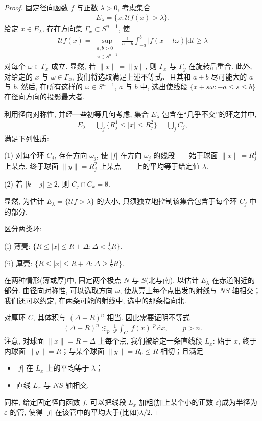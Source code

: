 \begin{proof}
固定径向函数 $f$ 与正数 $\lambda > 0$, 考虑集合
\begin{align*}
  E_{\lambda}=\{x:\mathcal{U}f(x)>\lambda\}.
\end{align*}
给定 $x \in E_\lambda$, 存在方向集 $\Gamma_x \subset S^{n-1}$, 使
\begin{align*}
  \mathcal{U}f(x)=\sup_{\substack{a,b>0\\ \omega\in S^{n-1}}}\frac{1}{a+b}\int_{-a}^{b}\left|f(x+t\omega)\right|\mathrm{d}t\geq\lambda
\end{align*}
对每个 $\omega \in \Gamma_x$ 成立. 显然, 若 $\|x\| = \|y\|$, 则 $\Gamma_x$ 与 $\Gamma_y$ 在旋转后重合. 此外, 对给定的 $x$ 与 $\omega \in \Gamma_x$, 我们将选取满足上述不等式、且其和 $a + b$ 尽可能大的 $a$ 与 $b$. 然后, 在所有这样的 $\omega \in S^{n-1}$, $a$ 与 $b$ 中, 选出使线段 $\{x + s\omega : -a \leq s \leq b\}$ 在径向方向的投影最大者.

利用径向对称性, 并经一些初等几何考虑, 集合 $E_{\lambda}$ 包含在``几乎不交''的环之并中,
\begin{align*}
  E_{\lambda}=\bigcup_{j}\{R_{j}^{1}\leq|x|\leq R_{j}^{2}\}=\bigcup_{j}C_{j},
\end{align*}
满足下列性质:

(1) 对每个环 $C_j$, 存在方向 $\omega_j$, 使 $|f|$ 在方向 $\omega_j$ 的线段——始于球面 $\|x\| = R_j^1$ 上某点, 终于球面 $\|y\| = R_j^2$ 上某点——上的平均等于给定值 $\lambda$.

(2) 若 $|k - j| \geq 2$, 则 $C_j \cap C_k = \emptyset$.

显然, 为估计 $E_\lambda = \{\mathcal{U}f > \lambda\}$ 的大小, 只须独立地控制该集合包含于每个环 $C_j$ 中的部分.

区分两类环:

(i) 薄壳: $\{R \leq |x| \leq R + \Delta : \Delta < \tfrac{1}{2}R\}$.

(ii) 厚壳: $\{R \leq |x| \leq R + \Delta : \Delta \geq \frac{1}{2}R\}$.

在两种情形(薄或厚)中, 固定两个极点 $N$ 与 $S$(北与南), 以估计 $E_{\lambda}$ 在赤道附近的部分. 由径向对称性, 可以选取方向 $\omega$, 使从壳上每个点出发的射线与 $NS$ 轴相交；我们还可以约定, 在两条可能的射线中, 选中的那条指向北.

对厚环 $C$, 其体积与 $(\Delta + R)^n$ 相当. 因此需要证明不等式
\begin{align*}
  \left(\Delta+R\right)^{n}\lesssim_{p}\frac{1}{\lambda^{p}}\int_{C}\left|f(x)\right|^{p}\,\mathrm{d}x,\qquad p>n.
\end{align*}
注意, 对球面 $\|x\| = R + \Delta$ 上每个点, 我们被给定一条直线段 $L_x$: 始于 $x$, 终于内球面 $\|y\| = R$；与某个球面 $\|y\| = R_0 \leq R$ 相切；且满足
\begin{itemize}
\item $|f|$ 在 $L_{x}$ 上的平均等于 $\lambda$；
\item 直线 $L_{x}$ 与 $NS$ 轴相交.
\end{itemize}
同样, 给定固定径向函数 $f$, 可以把线段 $L_x$ 加粗(加上某个小的正数 $\varepsilon$)成为半径为 $\varepsilon$ 的管, 使得 $|f|$ 在该管中的平均大于(比如)$\lambda/2$.


\end{proof}
